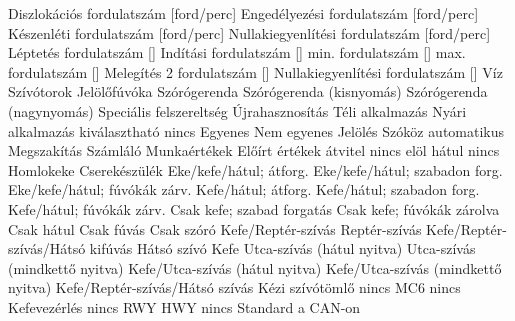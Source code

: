  {Diszlokációs fordulatszám [ford/perc]}
 {Engedélyezési fordulatszám [ford/perc]}
 {Készenléti fordulatszám [ford/perc]}
 {Nullakiegyenlítési fordulatszám [ford/perc]}
 {Léptetés fordulatszám [\percent ]}
 {Indítási fordulatszám [\percent ]}
 {min. fordulatszám [\percent ]}
 {max. fordulatszám [\percent ]}
 {Melegítés 2 fordulatszám [\percent ]}
 {Nullakiegyenlítési fordulatszám [\percent ]}
 {Víz}
 {Szívótorok}
 {Jelölőfúvóka}
 {Szórógerenda}
 {Szórógerenda (kisnyomás)}
 {Szórógerenda (nagynyomás)}
 {Speciális felszereltség}
 {Újrahasznosítás}
 {Téli alkalmazás}
 {Nyári alkalmazás}
 {kiválasztható}
 {nincs}
 {Egyenes}
 {Nem egyenes}
 {Jelölés}
 {Szóköz}
 {automatikus}
 {Megszakítás}
 {Számláló}
 {Munkaértékek}
 {Előírt értékek}
 {átvitel}
 {nincs}
 {elöl}
 {hátul}
 {nincs}
 {Homlokeke}
 {Cserekészülék}
 {Eke/kefe/hátul; átforg.}
 {Eke/kefe/hátul; szabadon forg.}
 {Eke/kefe/hátul; fúvókák zárv.}
 {Kefe/hátul; átforg.}
 {Kefe/hátul; szabadon forg.}
 {Kefe/hátul;  fúvókák zárv.}
 {Csak kefe; szabad forgatás}
 {Csak kefe; fúvókák zárolva}
 {Csak hátul}
 {Csak fúvás}
 {Csak szóró}
 {Kefe/Reptér-szívás}
 {Reptér-szívás}
 {Kefe/Reptér-szívás/Hátsó kifúvás}
 {Hátsó szívó}
 {Kefe}
 {Utca-szívás (hátul nyitva)}
 {Utca-szívás (mindkettő nyitva)}
 {Kefe/Utca-szívás (hátul nyitva)}
 {Kefe/Utca-szívás (mindkettő nyitva)}
 {Kefe/Reptér-szívás/Hátsó szívás}
 {Kézi szívótömlő}
 {nincs}
 {MC6}
 {nincs}
 {Kefevezérlés}
 {nincs}
 {RWY}
 {HWY}
 {nincs}
 {Standard a CAN-on}

